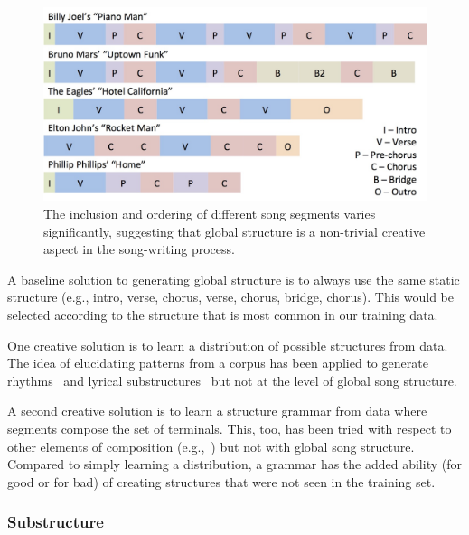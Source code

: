 \documentclass[11pt,phd]{byuprop}
\begin{document}
\begin{figure}
  \centering
  \includegraphics[width=.65\textwidth]{graphics/segment_variety.jpg}
  \caption{The inclusion and ordering of different song segments varies significantly, suggesting that global structure is a non-trivial creative aspect in the song-writing process.}
    \label{fig:segment_variety}
\end{figure}

A baseline solution to generating global structure is to always use the same static structure (e.g., intro, verse, chorus, verse, chorus, bridge, chorus). This would be selected according to the structure that is most common in our training data.

One creative solution is to learn a distribution of possible structures from data. The idea of elucidating patterns from a corpus has been applied to generate rhythms~\cite{monteith2012automatic} and lyrical substructures~\cite{scirea2015smug} but not at the level of global song structure. 

A second creative solution is to learn a structure grammar from data where segments compose the set of terminals. This, too, has been tried with respect to other elements of composition (e.g.,~\cite{steedman1984generative}) but not with global song structure. Compared to simply learning a distribution, a grammar has the added ability (for good or for bad) of creating structures that were not seen in the training set.

\subsubsection{Substructure}
\end{document}
